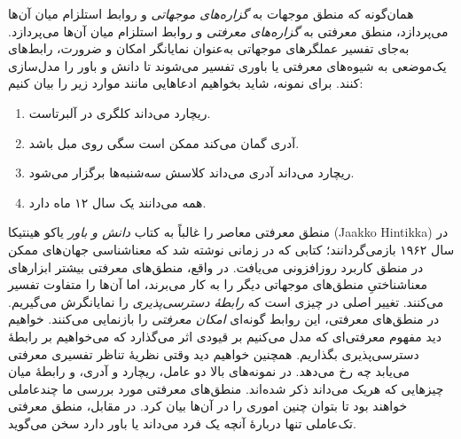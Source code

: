 \documentclass[../../../include/open-logic-section]{subfiles}
\begin{document}


همان‌گونه که منطق موجهات به \emph{گزاره‌های موجهاتی} و روابط استلزام
میان آن‌ها می‌پردازد، منطق معرفتی به \emph{گزاره‌های معرفتی} و روابط
استلزام میان آن‌ها می‌پردازد. به‌جای تفسیر عملگرهای موجهاتی به‌عنوان
نمایانگر امکان و ضرورت، رابط‌های یک‌موضعی به شیوه‌های معرفتی یا باوری
تفسیر می‌شوند تا دانش و باور را مدل‌سازی کنند. برای نمونه، شاید بخواهیم
ادعاهایی مانند موارد زیر را بیان کنیم:

\begin{enumerate}
\item ریچارد می‌داند کلگری در آلبرتاست.
\item آدری گمان می‌کند ممکن است سگی روی مبل باشد.
\item ریچارد می‌داند آدری می‌داند کلاسش سه‌شنبه‌ها برگزار می‌شود.
\item همه می‌دانند یک سال ۱۲ ماه دارد.
\end{enumerate}
منطق معرفتی معاصر را غالباً به کتاب \emph{دانش و باور} یاکو هینتیکا
(Jaakko Hintikka) در سال ۱۹۶۲ بازمی‌گردانند؛ کتابی که در زمانی نوشته
شد که معناشناسی جهان‌های ممکن در منطق کاربرد روزافزونی می‌یافت. در واقع،
منطق‌های معرفتی بیشتر ابزارهای معناشناختیِ منطق‌های موجهاتی دیگر را به
کار می‌برند، اما آن‌ها را متفاوت تفسیر می‌کنند. تغییر اصلی در چیزی است
که \emph{رابطهٔ دسترسی‌پذیری} را نمایانگرش می‌گیریم. در منطق‌های معرفتی،
این روابط گونه‌ای \emph{امکان معرفتی} را بازنمایی می‌کنند. خواهیم دید
مفهوم معرفتی‌ای که مدل می‌کنیم بر قیودی اثر می‌گذارد که می‌خواهیم بر
رابطهٔ دسترسی‌پذیری بگذاریم. همچنین خواهیم دید وقتی نظریهٔ تناظر تفسیری
معرفتی می‌یابد چه رخ می‌دهد. در نمونه‌های بالا دو عامل، ریچارد و آدری،
و رابطهٔ میان چیزهایی که هریک می‌داند ذکر شده‌اند. منطق‌های معرفتی مورد
بررسی ما چندعاملی خواهند بود تا بتوان چنین اموری را در آن‌ها بیان کرد.
در مقابل، منطق معرفتی تک‌عاملی تنها دربارهٔ آنچه یک فرد می‌داند یا
باور دارد سخن می‌گوید.
\end{document}
